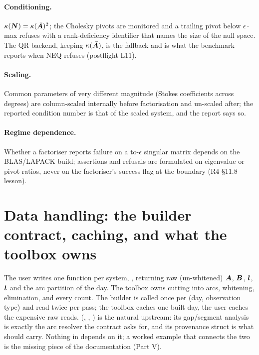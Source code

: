 \paragraph{Conditioning.} $\kappa(\bm{N})=\kappa(\bar{\bm{A}})^2$; the Cholesky pivots are monitored and a trailing pivot below $\epsilon\cdot$max refuses with a rank-deficiency identifier that names the size of the null space. The QR backend, keeping $\kappa(\bar{\bm{A}})$, is the fallback and is what the benchmark reports when NEQ refuses (postflight L11).

\paragraph{Scaling.} Common parameters of very different magnitude (Stokes coefficients across degrees) are column-scaled internally before factorisation and un-scaled after; the reported condition number is that of the scaled system, and the report says so.

\paragraph{Regime dependence.} Whether a factoriser reports failure on a to-$\epsilon$ singular matrix depends on the BLAS/LAPACK build; assertions and refusals are formulated on eigenvalue or pivot ratios, never on the factoriser's success flag at the boundary (R4 §11.8 lesson).

\section{Data handling: the builder contract, caching, and what the toolbox owns}

The user writes one function per system, , returning raw (un-whitened) $\bm{A}$, $\bm{B}$, $\bm{l}$, $\bm{t}$ and the arc partition of the day. The toolbox owns cutting into arcs, whitening, elimination, and every count. The builder is called once per (day, observation type) and read twice per pass; the toolbox caches one built day, the user caches the expensive raw reads.  (, , ) is the natural upstream: its gap/segment analysis is exactly the arc resolver the contract asks for, and its provenance struct is what  should carry. Nothing in \lsq{} depends on it; a worked example that connects the two is the missing piece of the documentation (Part V).
